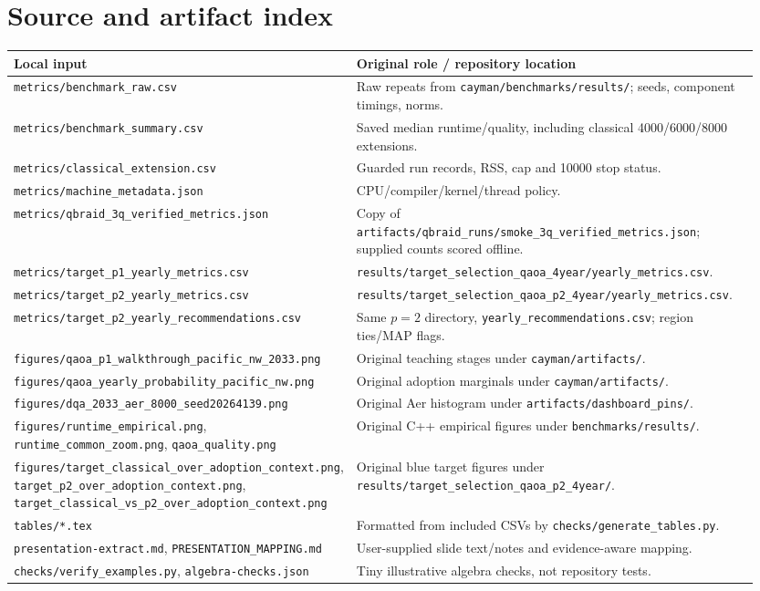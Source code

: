 \documentclass[11pt,letterpaper]{article}
\newcommand{\file}[1]{\nolinkurl{#1}}
\begin{document}
\section{Source and artifact index}\label{sec:index}
\small
\begin{longtable}{@{}p{0.37\linewidth}p{0.58\linewidth}@{}}\toprule
Local input & Original role / repository location\\\midrule\endhead
\file{metrics/benchmark_raw.csv} & Raw repeats from \file{cayman/benchmarks/results/}; seeds, component timings, norms.\\
\file{metrics/benchmark_summary.csv} & Saved median runtime/quality, including classical 4000/6000/8000 extensions.\\
\file{metrics/classical_extension.csv} & Guarded run records, RSS, cap and 10000 stop status.\\
\file{metrics/machine_metadata.json} & CPU/compiler/kernel/thread policy.\\
\file{metrics/qbraid_3q_verified_metrics.json} & Copy of \file{artifacts/qbraid_runs/smoke_3q_verified_metrics.json}; supplied counts scored offline.\\
\file{metrics/target_p1_yearly_metrics.csv} & \file{results/target_selection_qaoa_4year/yearly_metrics.csv}.\\
\file{metrics/target_p2_yearly_metrics.csv} & \file{results/target_selection_qaoa_p2_4year/yearly_metrics.csv}.\\
\file{metrics/target_p2_yearly_recommendations.csv} & Same $p=2$ directory, \file{yearly_recommendations.csv}; region ties/MAP flags.\\
\file{figures/qaoa_p1_walkthrough_pacific_nw_2033.png} & Original teaching stages under \file{cayman/artifacts/}.\\
\file{figures/qaoa_yearly_probability_pacific_nw.png} & Original adoption marginals under \file{cayman/artifacts/}.\\
\file{figures/dqa_2033_aer_8000_seed20264139.png} & Original Aer histogram under \file{artifacts/dashboard_pins/}.\\
\file{figures/runtime_empirical.png}, \file{runtime_common_zoom.png}, \file{qaoa_quality.png} & Original C++ empirical figures under \file{benchmarks/results/}.\\
\file{figures/target_classical_over_adoption_context.png}, \file{target_p2_over_adoption_context.png}, \file{target_classical_vs_p2_over_adoption_context.png} & Original blue target figures under \file{results/target_selection_qaoa_p2_4year/}.\\
\file{tables/*.tex} & Formatted from included CSVs by \file{checks/generate_tables.py}.\\
\file{presentation-extract.md}, \file{PRESENTATION_MAPPING.md} & User-supplied slide text/notes and evidence-aware mapping.\\
\file{checks/verify_examples.py}, \file{algebra-checks.json} & Tiny illustrative algebra checks, not repository tests.\\\bottomrule
\end{longtable}\normalsize
\end{document}
